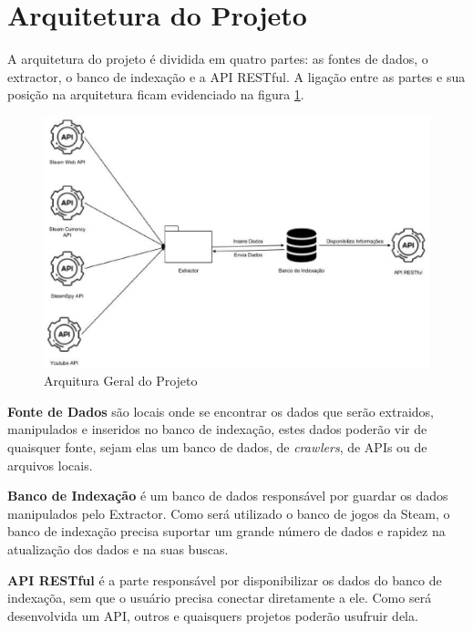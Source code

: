 \section{Arquitetura do Projeto}
A arquitetura do projeto é dividida em quatro partes: as fontes de dados, o extractor, o banco de indexação e a API RESTful. A ligação entre as partes e sua posição na arquitetura ficam evidenciado na figura \ref{image:arquitetura}.
\begin{figure} [H]
\centering
\includegraphics[scale=0.5]{figuras/arquiteturaProjeto.eps}
\caption{Arquitura Geral do Projeto}
\label{image:arquitetura}
\end{figure}
\textbf{Fonte de Dados} são locais onde se encontrar os dados que serão extraidos, manipulados e inseridos no banco de indexação, estes dados poderão vir de quaisquer fonte, sejam elas um banco de dados, de \textit{crawlers}, de APIs ou de arquivos locais.

\textbf{Banco de Indexação} é um banco de dados responsável por guardar os dados manipulados pelo Extractor. Como será utilizado o banco de jogos da Steam, o banco de indexação precisa suportar um grande número de dados e rapidez na atualização dos dados e na suas buscas.

\textbf{API RESTful} é a parte responsável por disponibilizar os dados do banco de indexaçõa, sem que o usuário precisa conectar diretamente a ele. Como será desenvolvida um API, outros e quaisquers projetos poderão usufruir dela.
